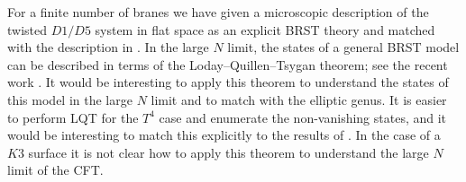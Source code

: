\documentclass[../main.tex]{subfiles}
\begin{document}
For a finite number of branes we have given a microscopic description of the twisted $D1/D5$ system in flat space as an explicit BRST theory and matched with the description in \cite{Davidetal}.
In the large $N$ limit, the states of a general BRST model can be described in terms of the Loday--Quillen--Tsygan theorem; see the recent work \cite{costello2015quantization,CostelloGaiotto,Ginot:2021thu,Budzik:2023xbr}.
It would be interesting to apply this theorem to understand the states of this model in the large $N$ limit and to match with the elliptic genus. It is easier to perform LQT for the $T^4$ case and enumerate the non-vanishing states, and it would be interesting to match this explicitly to the results of \cite{CP}. 
In the case of a $K3$ surface it is not clear how to apply this theorem to understand the large $N$ limit of the CFT.
\end{document}
